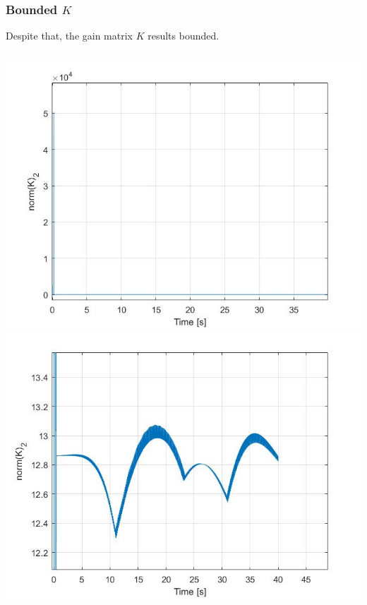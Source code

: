 \documentclass{beamer}
\begin{document}
	\begin{frame}
		\frametitle{Bounded $K$}
		Despite that, the gain matrix $K$ results bounded.
		\begin{columns}[t]
			\centering
			\includegraphics[scale=0.25]{kric}\\
			\centering
			\includegraphics[scale=0.25]{kric2}\\
		\end{columns}
	\end{frame}
\end{document}
